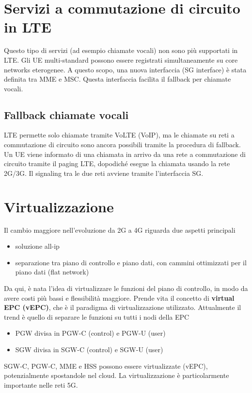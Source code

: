 \section{Servizi a commutazione di circuito in LTE}
Questo tipo di servizi (ad esempio chiamate vocali) non sono più supportati in LTE.
Gli UE multi-standard possono essere registrati simultaneamente su core networks eterogenee.
A questo scopo, una nuova interfaccia (SG interface) è stata definita tra MME e MSC. Questa interfaccia facilita il fallback per chiamate vocali.
\subsection{Fallback chiamate vocali}
LTE permette solo chiamate tramite VoLTE (VoIP), ma le chiamate su reti a commutazione di circuito sono ancora possibili tramite la procedura di fallback.
Un UE viene informato di una chiamata in arrivo da una rete a commutazione di circuito tramite il paging LTE, dopodiché esegue la chiamata usando la rete 2G/3G.
Il signaling tra le due reti avviene tramite l'interfaccia SG.
\section{Virtualizzazione}
Il cambio maggiore nell'evoluzione da 2G a 4G riguarda due aspetti principali
\begin{itemize}
	\item soluzione all-ip
	\item separazione tra piano di controllo e piano dati, con cammini ottimizzati per il piano dati (flat network)
\end{itemize}
Da qui, è nata l'idea di virtualizzare le funzioni del piano di controllo, in modo da avere costi più bassi e flessibilità maggiore.
Prende vita il concetto di \textbf{virtual EPC (vEPC)}, che è il paradigma di virtualizzazione utilizzato.
Attualmente il trend è quello di separare le funzioni su tutti i nodi della EPC
\begin{itemize}
	\item PGW divisa in PGW-C (control) e PGW-U (user)
	\item SGW divisa in SGW-C (control) e SGW-U (user)
\end{itemize}
SGW-C, PGW-C, MME e HSS possono essere virtualizzate (vEPC), potenzialmente spostandole nel cloud. La virtualizzazione è particolarmente importante nelle reti 5G.
